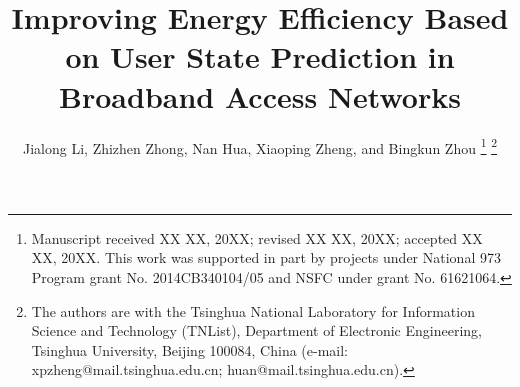 \documentclass[journal]{IEEEtran}
\begin{document}
%
\title{\textbf{Improving Energy Efficiency Based on User State Prediction in Broadband Access Networks}}
%
%
%

\author{Jialong Li, Zhizhen Zhong, Nan Hua, Xiaoping Zheng, and Bingkun Zhou%
\thanks{Manuscript received XX XX, 20XX; revised XX XX, 20XX; accepted XX XX, 20XX. This work was supported in part by projects under National 973 Program grant No. 2014CB340104/05 and NSFC under grant No. 61621064.}
\thanks{The authors are with the Tsinghua National Laboratory for Information Science and Technology (TNList), Department of Electronic Engineering, Tsinghua University, Beijing 100084, China (e-mail: xpzheng@mail.tsinghua.edu.cn; huan@mail.tsinghua.edu.cn).}}

% 
%
\end{document}
